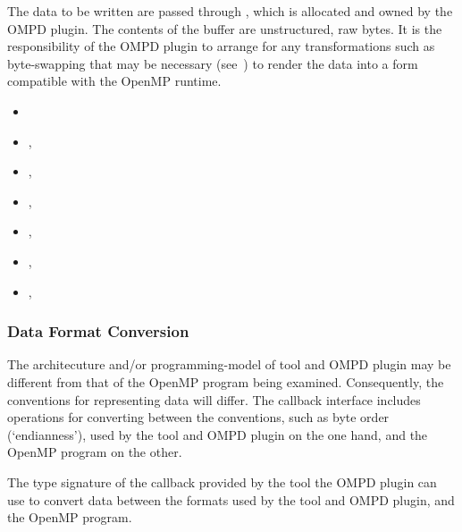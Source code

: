 The data to be written are passed through , which is allocated and
owned by the OMPD plugin.
The contents of the buffer are unstructured, raw bytes.
It is the responsibility of the OMPD plugin to arrange for
any transformations such as byte-swapping that may be necessary
(see~)
to render the data into a form compatible with the OpenMP runtime.

\crossreferences
\begin{itemize}
\item
   
\item
  , 
\item
  , 
\item
  , 
\item
  , 
\item
  , 
\item
  , 
\end{itemize}

\subsubsection{Data Format Conversion}
\label{subsubsec:data-format-conversion}

The architecuture and/or programming-model of tool and
OMPD plugin may be different from that of the OpenMP program being
examined.
Consequently, the conventions for representing data will differ.
The callback interface includes operations for converting between
the conventions, such as byte order (`endianness'),
used by the tool and OMPD plugin on the
one hand, and the OpenMP program on the other.

\label{subsubsubsec:ompd_callback_device_host_fn_t}

\summary

The type signature of the callback provided by the tool the
OMPD plugin can use to convert data between the formats used by the
tool and OMPD plugin, and the OpenMP program.


